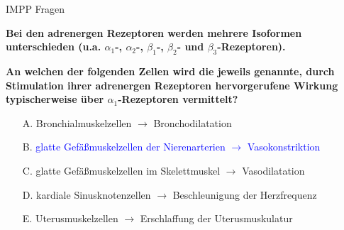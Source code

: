 \documentclass{beamer}
\begin{document}
\begin{frame}{IMPP Fragen}


\textbf{Bei den adrenergen Rezeptoren werden mehrere Isoformen unterschieden (u.a. \(\alpha_1\)-, \(\alpha_2\)-, \(\beta_1\)-, \(\beta_2\)- und \(\beta_3\)-Rezeptoren). }

\textbf{An welchen der folgenden Zellen wird die jeweils genannte, durch Stimulation ihrer adrenergen Rezeptoren hervorgerufene Wirkung typischerweise über \(\alpha_1\)-Rezeptoren vermittelt?} \\[0.2 cm]

\begin{itemize}
\item[A.] Bronchialmuskelzellen \(\rightarrow\) Bronchodilatation
\item[B.] \textcolor{blue}{glatte Gefäßmuskelzellen der Nierenarterien \(\rightarrow\) Vasokonstriktion} %
\item[C.]  glatte Gefäßmuskelzellen  im Skelettmuskel \(\rightarrow\) Vasodilatation
\item[D.]  kardiale Sinusknotenzellen \(\rightarrow\) Beschleunigung der Herzfrequenz
\item[E.] Uterusmuskelzellen \(\rightarrow\) Erschlaffung der Uterusmuskulatur 

\end{itemize}


\end{frame}



\begin{frame}
\end{frame}
\end{document}

